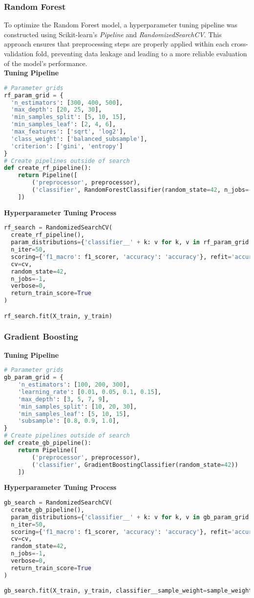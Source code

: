 \documentclass[twoside,final]{hcmut-report}
\begin{document}
\subsubsection{Random Forest}
To optimize the Random Forest model, a hyperparameter tuning pipeline was constructed using Scikit-learn's \textit{Pipeline} and \textit{RandomizedSearchCV}. This approach ensures that preprocessing steps are properly applied within each cross-validation fold, preventing data leakage and leading to a more reliable evaluation of the model's performance.\\
\textbf{Tuning Pipeline}
\begin{lstlisting}[language=python]
# Parameter grids
rf_param_grid = {
  'n_estimators': [300, 400, 500],
  'max_depth': [20, 25, 30],
  'min_samples_split': [5, 10, 15],
  'min_samples_leaf': [2, 4, 6],
  'max_features': ['sqrt', 'log2'],
  'class_weight': ['balanced_subsample'],
  'criterion': ['gini', 'entropy']
}
# Create pipelines outside of search
def create_rf_pipeline():
    return Pipeline([
        ('preprocessor', preprocessor),
        ('classifier', RandomForestClassifier(random_state=42, n_jobs=-1))
    ])
\end{lstlisting}
\textbf{Hyperparameter Tuning Process}
\begin{lstlisting}[language=python]
rf_search = RandomizedSearchCV(
  create_rf_pipeline(),
  param_distributions={'classifier__' + k: v for k, v in rf_param_grid.items()},
  n_iter=50,
  scoring={'f1_macro': f1_scorer, 'accuracy': 'accuracy'}, refit='accuracy',
  cv=cv,
  random_state=42,
  n_jobs=-1,
  verbose=0,
  return_train_score=True
)

rf_search.fit(X_train, y_train)
\end{lstlisting}
\subsubsection{Gradient Boosting}
\textbf{Tuning Pipeline}
\begin{lstlisting}[language=python]
# Parameter grids
gb_param_grid = {
    'n_estimators': [100, 200, 300],
    'learning_rate': [0.01, 0.05, 0.1, 0.15],
    'max_depth': [3, 5, 7, 9],
    'min_samples_split': [10, 20, 30],
    'min_samples_leaf': [5, 10, 15],
    'subsample': [0.8, 0.9, 1.0],
}
# Create pipelines outside of search
def create_gb_pipeline():
    return Pipeline([
        ('preprocessor', preprocessor),
        ('classifier', GradientBoostingClassifier(random_state=42))
    ])

\end{lstlisting}
\textbf{Hyperparameter Tuning Process}
\begin{lstlisting}[language=python]
gb_search = RandomizedSearchCV(
  create_gb_pipeline(),
  param_distributions={'classifier__' + k: v for k, v in gb_param_grid.items()},
  n_iter=50,
  scoring={'f1_macro': f1_scorer, 'accuracy': 'accuracy'}, refit='accuracy',
  cv=cv,
  random_state=42,
  n_jobs=-1,
  verbose=0,
  return_train_score=True
)

gb_search.fit(X_train, y_train, classifier__sample_weight=sample_weights)
\end{lstlisting}
\end{document}

